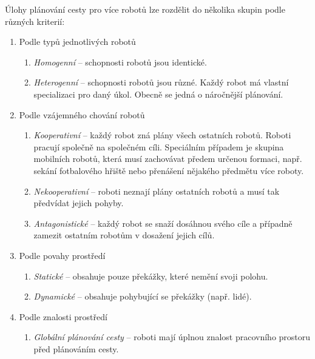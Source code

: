 Úlohy plánování cesty pro více robotů lze rozdělit do několika skupin podle různých kriterií:
\begin{enumerate}
	\item Podle typů jednotlivých robotů
	\begin{enumerate}
		\item \emph{Homogenní} -- schopnosti robotů jsou identické.
		\item \emph{Heterogenní} -- schopnosti robotů jsou různé. Každý robot má vlastní specializaci pro daný úkol. Obecně se jedná o náročnější plánování.
	\end{enumerate}
	\item Podle vzájemného chování robotů
	\begin{enumerate}
		\item \emph{Kooperativní} -- každý robot zná plány všech ostatních robotů. Roboti pracují společně na společném cíli. Speciálním případem je skupina mobilních robotů, která musí zachovávat předem určenou formaci, např. sekání fotbalového hřiště nebo přenášení nějakého předmětu více roboty.
		\item \emph{Nekooperativní} -- roboti neznají plány ostatních robotů a musí tak předvídat jejich pohyby.
		\item \emph{Antagonistické} -- každý robot se snaží dosáhnou svého cíle a případně zamezit ostatním robotům v dosažení jejich cílů.
	\end{enumerate}
	\item Podle povahy prostředí
	\begin{enumerate}
		\item \emph{Statické} -- obsahuje pouze překážky, které nemění svoji polohu.
		\item \emph{Dynamické} -- obsahuje pohybující se překážky (např. lidé).
	\end{enumerate}
	\item Podle znalosti prostředí
	\begin{enumerate}
		\item \emph{Globální plánování cesty} -- roboti mají úplnou znalost pracovního prostoru před plánováním cesty.

\end{enumerate}
\end{enumerate}
